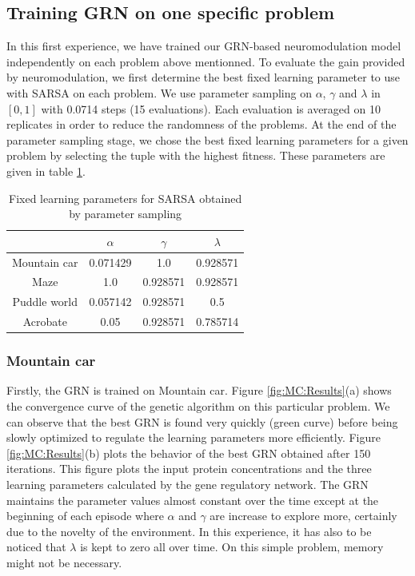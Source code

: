\subsection{Training GRN on one specific problem}
In this first experience, we have trained our GRN-based neuromodulation model independently on each problem above mentionned. To evaluate the gain provided by neuromodulation, we first determine the best fixed learning parameter to use with SARSA on each problem. We use parameter sampling on $\alpha$, $\gamma$ and $\lambda$ in $[0, 1]$ with 0.0714 steps (15 evaluations). Each evaluation is averaged on 10 replicates in order to reduce the randomness of the problems. At the end of the parameter sampling stage, we chose the best fixed learning parameters for a given problem by selecting the tuple with the highest fitness. These parameters are given in table \ref{tab:SARSAFixedParams}.

\begin{table}[h]
\center
\begin{tabular}{|c|ccc|}
\cline{2-4}
\multicolumn{1}{c|}{ }	& $\alpha$	& $\gamma$	& $\lambda$	\\\hline
Mountain car			& 0.071429	& 1.0		& 0.928571 	\\%
Maze				& 1.0		& 0.928571	& 0.928571	\\%
Puddle world			&  0.057142	& 0.928571	& 0.5		\\%
Acrobate				& 0.05		& 0.928571	& 0.785714	\\\hline
\end{tabular}
\caption{Fixed learning parameters for SARSA obtained by parameter sampling}\label{tab:SARSAFixedParams}
\end{table}

\subsubsection{Mountain car}
Firstly, the GRN is trained on Mountain car. Figure \ref{fig:MC:Results}(a) shows the convergence curve of the genetic algorithm on this particular problem. We can observe that the best GRN is found very quickly (green curve) before being slowly optimized to regulate the learning parameters more efficiently. Figure \ref{fig:MC:Results}(b) plots the behavior of the best GRN obtained after 150 iterations. This figure plots the input protein concentrations and the three learning parameters calculated by the gene regulatory network. The GRN maintains the parameter values almost constant over the time except at the beginning of each episode where $\alpha$ and $\gamma$ are increase to explore more, certainly due to the novelty of the environment. In this experience, it has also to be noticed that $\lambda$ is kept to zero all over time. On this simple problem, memory might not be necessary. 

